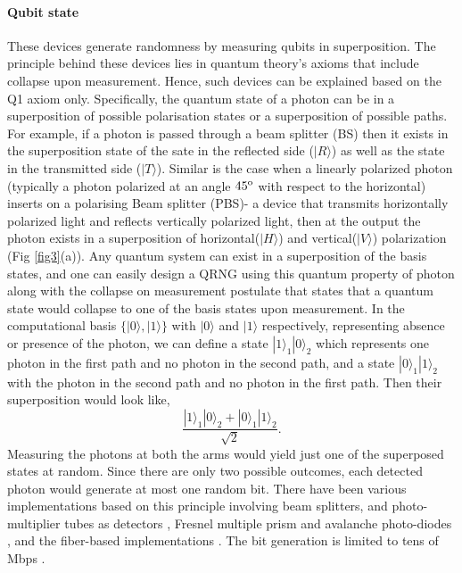 \documentclass[]{interact}
\theoremstyle{plain}%
\theoremstyle{definition}
\theoremstyle{remark}
\begin{document}
\paragraph{Qubit state} These devices generate randomness by measuring qubits in superposition. The principle behind these devices lies in quantum theory's axioms that include collapse upon measurement. Hence, such devices can be explained based on the Q1 axiom only.  Specifically, the quantum state of a photon can be in a superposition of possible polarisation states or a superposition of possible paths. For example, if a photon is passed through a beam splitter (BS) then it exists in the superposition state of the sate in the reflected side ($\vert R \rangle$) as well as the state in the transmitted side ($\vert T \rangle$). Similar is the case when a linearly polarized photon (typically a photon polarized at an angle ${45}^{\rm{o}}$ with respect to the horizontal) inserts on a polarising Beam splitter (PBS)- a device that transmits horizontally polarized light and reflects vertically polarized light, then at the output the photon exists in a superposition of horizontal($\vert H \rangle$) and vertical($\vert V \rangle$) polarization (Fig \ref{fig3}(a)). Any quantum system can exist in a superposition of the basis states, and one can easily design a QRNG using this quantum property of photon along with the collapse on measurement postulate that states that a quantum state would collapse to one of the basis states upon measurement. In the computational basis $\{\vert 0 \rangle,\vert 1 \rangle \}$ with $\vert 0 \rangle$ and  $\vert 1 \rangle$ respectively, representing absence or presence of the photon, we can define
a state $|1\rangle_{1}|0\rangle_{2}$ which represents one photon in the first path and no photon in the second path, and a state $|0\rangle_{1}|1\rangle_{2}$ with the photon in the
second path and no photon in the first path. Then their superposition would look like,
$$
\frac{|1\rangle_{1}|0\rangle_{2}+|0\rangle_{1}|1\rangle_{2}}{\sqrt{2}}.
$$
Measuring the photons at both the arms would yield just one of the superposed states at random. Since there are only two possible outcomes, each detected photon would generate at most one random bit. There have been various implementations based on this principle involving beam splitters, and photo-multiplier tubes as detectors \cite{PhysRevLett.81.5039,jennewein2000fast}, Fresnel multiple prism  and avalanche photo-diodes \cite{doi:10.1063/1.2338830}, and the fiber-based implementations \cite{ManliXu2015}. The bit generation is limited to tens of Mbps \cite{jennewein2000fast}. 
\end{document}
